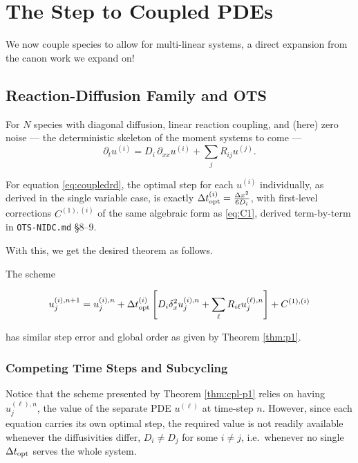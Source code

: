 \section{The Step to Coupled PDEs}\label{sec:coupled}

We now couple species to allow for multi-linear systems, a direct expansion from the canon work we expand on!

\subsection{Reaction-Diffusion Family and OTS}

For $N$ species with diagonal diffusion, linear reaction coupling, and (here) zero noise --- the deterministic skeleton of the moment systems to come ---
\begin{equation}\label{eq:coupledrd}
\partial_t u^{(i)} = D_i\,\partial_{xx}u^{(i)} + \sum_j R_{ij}u^{(j)}.
\end{equation}

\begin{lemma}
  For equation \eqref{eq:coupledrd}, the optimal step for each $u^{(i)}$ individually, as derived in the single variable case, is exactly $\Delta t_{\mathrm{opt}}^{(i)} = \frac{\Delta x^2}{6D_i}$, with first-level corrections $C^{(1),(i)}$ of the same algebraic form as \eqref{eq:C1}, derived term-by-term in \texttt{OTS-NIDC.md} \S8--9.
\end{lemma}

With this, we get the desired theorem as follows.

\begin{theorem}\label{thm:cpl-p1}
  The scheme

  \begin{equation}\label{eq:coupledscheme}
      u^{(i), n+1}_{j} = u^{(i), n}_{j} + \Delta t_{\mathrm{opt}}^{(i)} \left[ D_i \delta_x^2 u^{(i), n}_{j} + \sum_{\ell} R_{i\ell} u^{(\ell), n}_{j} \right] + C^{(1), (i)}
  \end{equation}

  has similar step error and global order as given by Theorem \ref{thm:p1}.
\end{theorem}

\subsubsection{Competing Time Steps and Subcycling}

Notice that the scheme presented by Theorem \ref{thm:cpl-p1} relies on having $u^{(\ell), n}_{j}$, the value of the separate PDE $u^{(\ell)}$ at time-step $n$. However, since each equation carries its own optimal step, the required value is not readily available whenever the diffusivities differ, $D_i \neq D_j$ for some $i \neq j$, i.e.\ whenever no single $\Delta t_{\mathrm{opt}}$ serves the whole system.

